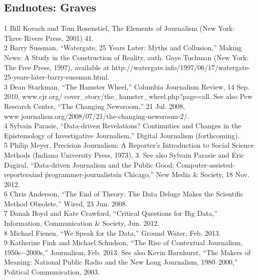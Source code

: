 \begin{itemize}
\begin{itemized}
\begin{itemize}
\section{Endnotes: Graves}
1 Bill Kovach and Tom Rosenstiel, The Elements of Journalism (New York: Three Rivers Press, 2001) 41.\\
2 Barry Sussman, ``Watergate, 25 Years Later: Myths and Collusion,'' Making News: A Study in the
Construction of Reality, auth. Gaye Tuchman (New York: The Free Press, 1997), available at
http://watergate.info/1997/06/17/watergate-25-years-later-barry-sussman.html.\\
3 Dean Starkman, ``The Hamster Wheel,'' Columbia Journalism Review, 14 Sep. 2010, www.cjr.org/
cover_story/the_hamster_wheel.php?page=all. See also Pew Research Center, ``The Changing
Newsroom,'' 21 Jul. 2008, www.journalism.org/2008/07/21/the-changing-newsroom-2/.\\
4 Sylvain Parasie, ``Data-driven Revelations? Continuities and Changes in the Epistemology of
Investigative Journalism,'' Digital Journalism (forthcoming).\\
5 Philip Meyer, Precision Journalism: A Reporter's Introduction to Social Science Methods
(Indiana University Press, 1973), 3. See also Sylvain Parasie and Eric Dagiral, ``Data-driven Journalism and the Public Good: \'Computer-assisted-reporters\' and \'programmer-journalists\'in Chicago,'' New Media & Society, 18 Nov. 2012.\\
6 Chris Anderson, ``The End of Theory: The Data Deluge Makes the Scientific Method Obsolete,''
Wired, 23 Jun. 2008.\\
7 Danah Boyd and Kate Crawford, ``Critical Questions for Big Data,'' Information, Communication &
Society, Jun. 2012.\\
8 Michael Fienen, ``We Speak for the Data,'' Ground Water, Feb. 2013.\\
9 Katherine Fink and Michael Schudson, ``The Rise of Contextual Journalism, 1950s−2000s,''
Journalism, Feb. 2013. See also Kevin Barnhurst, ``The Makers of Meaning: National Public Radio
and the New Long Journalism, 1980–2000,'' Political Communication, 2003.\\


\end{itemize}
\end{itemized}
\end{itemize}
